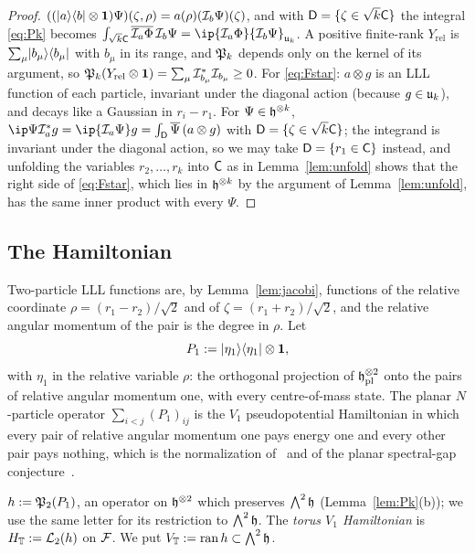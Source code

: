 \begin{proof}
$((\lvert a\rangle\langle b\rvert\otimes\mathbf{1})\Psi)(\zeta,\rho)=a(\rho)(\mathcal{I}_b\Psi)(\zeta)$, and with $\mathsf D=\{\zeta\in\sqrt k\mathsf{C}\}$ the integral
\eqref{eq:Pk} becomes $\int_{\sqrt k\cell}\overline{\Fib_a\Phi}\,\Fib_b\Psi=\ip{\Fib_a\Phi}{\Fib_b\Psi}_{\U_k}$. A positive finite-rank
$Y_{\mathrm{rel}}$ is $\sum_\mu\lvert b_\mu\rangle\langle b_\mu\rvert$ with $b_\mu$ in its range, and $\mathfrak{P}_k$ depends only on the kernel of its
argument, so $\mathfrak{P}_k(Y_{\mathrm{rel}}\otimes\mathbf{1})=\sum_\mu \mathcal{I}_{b_\mu}^*\mathcal{I}_{b_\mu}\ge0$. For \eqref{eq:Fstar}: $a\otimes g$ is an LLL function
of each particle, invariant under the diagonal action (because $g\in\mathfrak{u}_k$), and decays like a Gaussian in $r_i-r_1$. For
$\Psi\in\mathfrak{h}^{\otimes k}$, $\ip\Psi{\Fib_a^*g}=\ip{\Fib_a\Psi}g=\int_{\mathsf D}\overline\Psi\,(a\otimes g)$ with $\mathsf D=\{\zeta\in\sqrt k\mathsf{C}\}$; the
integrand is invariant under the diagonal action, so we may take $\mathsf D=\{r_1\in\mathsf{C}\}$ instead, and unfolding the variables
$r_2,\dots,r_k$ into $\mathsf{C}$ as in Lemma~\ref{lem:unfold} shows that the right side of \eqref{eq:Fstar}, which lies in
$\mathfrak{h}^{\otimes k}$ by the argument of Lemma~\ref{lem:unfold}, has the same inner product with every $\Psi$.
\end{proof}

\subsection{The Hamiltonian}

Two-particle LLL functions are, by Lemma~\ref{lem:jacobi}, functions of the relative coordinate $\rho=(r_1-r_2)/\sqrt2$
and of $\zeta=(r_1+r_2)/\sqrt2$, and the relative angular momentum of the pair is the degree in $\rho$. Let
\[
P_1:=\lvert \eta_1\rangle\langle \eta_1\rvert\otimes\mathbf{1},
\]
with $\eta_1$ in the relative variable $\rho$: the orthogonal projection of $\mathfrak{h}_{\mathrm{pl}}^{\otimes2}$ onto the pairs of relative
angular momentum one, with every centre-of-mass state. The planar $N$-particle operator $\sum_{i<j}(P_1)_{ij}$ is the
$V_1$ pseudopotential Hamiltonian in which every pair of relative angular momentum one pays energy one and every other
pair pays nothing, which is the normalization of~\cite{OAI:A-Fock-space-inequality-and-the-Laughlin-spectral-gap-September-24-2026}
and of the planar spectral-gap conjecture~\cite[Appendix~A]{Rougerie}.

\begin{definition}\label{def:HT}
$h:=\mathfrak{P}_2(P_1)$, an operator on $\mathfrak{h}^{\otimes2}$ which preserves $\bigwedge^2\mathfrak{h}$ (Lemma~\ref{lem:Pk}(b)); we use the same
letter for its restriction to $\bigwedge^2\mathfrak{h}$. The \emph{torus $V_1$ Hamiltonian} is $H_{\mathbb{T}}:=\mathcal{L}_2(h)$ on $\mathcal{F}$. We put
$V_{\mathbb{T}}:=\operatorname{ran} h\subset\bigwedge^2\mathfrak{h}$.
\end{definition}

